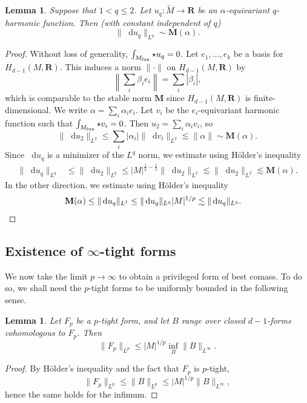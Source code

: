 \documentclass[reqno,11pt]{amsart}
\newcommand{\RR}{\mathbf{R}}
\newcommand*\dif{\mathop{}\!\mathrm{d}}
\newcommand{\Mass}{\mathbf M}
\newtheorem{lemma}[theorem]{Lemma}
\theoremstyle{definition}
\numberwithin{equation}{section}
\begin{document}
\begin{lemma}
Suppose that $1 < q \leq 2$.
Let $u_q: \tilde M \to \RR$ be an $\alpha$-equivariant $q$-harmonic function.
Then (with constant independent of $q$)
\begin{equation}\label{q Laplacian Sobolev regularity estimate}
\|\dif u_q\|_{L^q} \sim \Mass(\alpha).
\end{equation}
\end{lemma}
\begin{proof}
Without loss of generality, $\int_{M_{\rm fun}} \star u_q = 0$.
Let $e_1, \dots, e_k$ be a basis for $H_{d - 1}(M, \RR)$.
This induces a norm $\|\cdot\|$ on $H_{d - 1}(M, \RR)$ by
$$\left\|\sum_i \beta_i e_i\right\| = \sum_i |\beta_i|,$$
which is comparable to the stable norm $\Mass$ since $H_{d - 1}(M, \RR)$ is finite-dimensional.
We write $\alpha = \sum_i \alpha_i e_i$.
Let $v_i$ be the $e_i$-equivariant harmonic function such that $\int_{M_{\rm fun}} \star v_i = 0$.
Then $u_2 = \sum_i \alpha_i v_i$, so
$$\|\dif u_2\|_{L^2} \leq \sum_i |\alpha_i| \|\dif v_i\|_{L^2} \lesssim \|\alpha\| \sim \Mass(\alpha).$$
Since $\dif u_q$ is a minimizer of the $L^q$ norm, we estimate using H\"older's inequality 
\begin{align*}
\|\dif u_q\|_{L^q} &\leq \|\dif u_2\|_{L^q} \leq |M|^{\frac{1}{q} - \frac{1}{2}} \|\dif u_2\|_{L^2} \lesssim \|\dif u_2\|_{L^2} \lesssim \Mass(\alpha).
\end{align*}
In the other direction, we estimate using H\"older's inequality
\begin{align*}
\Mass(\alpha) &\leq \|\dif u_q\|_{L^1} \leq \|\dif u_q\|_{L^q} |M|^{1/p} \lesssim \|\dif u_q\|_{L^q}. \qedhere 
\end{align*}
\end{proof}


\subsection{\texorpdfstring{Existence of $\infty$-tight forms}{Existence of infinity-tight forms}}
We now take the limit $p \to \infty$ to obtain a privileged form of best comass.
To do so, we shall need the $p$-tight forms to be uniformly bounded in the following sense.

\begin{lemma}
Let $F_p$ be a $p$-tight form, and let $B$ range over closed $d - 1$-forms cohomologous to $F_p$. Then
\begin{equation}\label{infinity magnetic rules p magnetic}
	\|F_p\|_{L^p} \leq |M|^{1/p} \inf_B \|B\|_{L^\infty}.
\end{equation}
\end{lemma}
\begin{proof}
By H\"older's inequality and the fact that $F_p$ is $p$-tight,
$$\|F_p\|_{L^p} \leq \|B\|_{L^p} \leq |M|^{1/p} \|B\|_{L^\infty},$$
hence the same holds for the infimum.
\end{proof}
\end{document}
